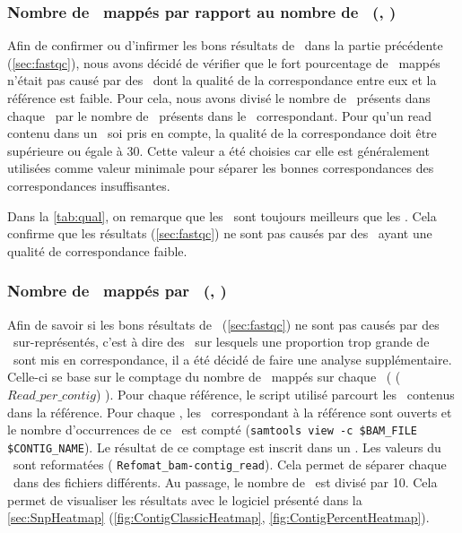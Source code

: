 \documentclass[../main]{subfiles} %
\begin{document}
\subsubsection{Nombre de \reads mappés par rapport au nombre de \contigs (\BamTrEx, \BamTrMo)}
Afin de confirmer ou d'infirmer les bons résultats de \TrEx dans la partie précédente (\cref{sec:fastqc}), nous avons décidé de vérifier que le fort pourcentage de \reads mappés n'était pas causé par des \reads dont la qualité de la correspondance entre eux et la référence est faible. Pour cela, nous avons divisé le nombre de \reads présents dans chaque \bam par le nombre de \reads présents dans le \fastq correspondant. Pour qu'un \gls{read} contenu dans un \bam soi pris en compte, la qualité de la correspondance doit être supérieure ou égale à 30. Cette valeur a été choisies car elle est généralement utilisées comme valeur minimale pour séparer les bonnes correspondances des correspondances insuffisantes.






Dans la \cref{tab:qual}, on remarque que les \BamTrEx sont toujours meilleurs que les \BamTrMo. Cela confirme que les résultats  (\cref{sec:fastqc}) ne sont pas causés par des \reads ayant une qualité de correspondance  faible.



\subsubsection{Nombre de \reads mappés par \contigs (\BamTrEx, \BamTrMo)}
\label{sec:NbReadsParCotigs}
Afin de savoir si les bons résultats de \TrEx (\cref{sec:fastqc}) ne sont pas causés par des \contigs sur-représentés, c'est à dire des \contigs sur lesquels une proportion trop grande de \reads sont mis en correspondance, il a été décidé de faire une analyse supplémentaire. Celle-ci  se base sur le  comptage du nombre de \reads mappés sur chaque \contigs (\cite{florent_f-marchalm1bioinfointernship2024-inrae_agap_ge2pop_2024} ($Read\_per\_contig$) ). Pour chaque référence, le script utilisé parcourt les \contigs contenus dans la référence. Pour chaque  \contig, les \bam correspondant à la référence sont ouverts et le nombre d'occurrences de ce \contig est compté (\lstinline{samtools view -c $BAM_FILE $CONTIG_NAME}). Le résultat de ce comptage est inscrit dans un \tsv. Les valeurs du \tsv sont reformatées (\cite{florent_f-marchalm1bioinfointernship2024-inrae_agap_ge2pop_2024} \lstinline{Refomat_bam-contig_read}). Cela permet de séparer chaque \bam dans des fichiers différents. Au passage, le nombre de \reads est divisé par 10. Cela permet de visualiser les résultats avec le logiciel présenté dans la \cref{sec:SnpHeatmap} (\cref{fig:ContigClassicHeatmap}, \cref{fig:ContigPercentHeatmap}).
\end{document}
